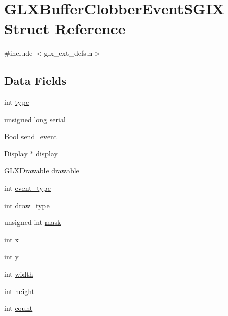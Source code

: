 \hypertarget{struct_g_l_x_buffer_clobber_event_s_g_i_x}{}\section{G\+L\+X\+Buffer\+Clobber\+Event\+S\+G\+IX Struct Reference}
\label{struct_g_l_x_buffer_clobber_event_s_g_i_x}


{\ttfamily \#include $<$glx\+\_\+ext\+\_\+defs.\+h$>$}

\subsection*{Data Fields}
\begin{DoxyCompactItemize}
\item 
int \hyperlink{struct_g_l_x_buffer_clobber_event_s_g_i_x_a36e3e8a5feea664623ea43d0f273b63a}{type}
\item 
unsigned long \hyperlink{struct_g_l_x_buffer_clobber_event_s_g_i_x_ac295e3276a7986eeae4d6a2a28c7e0b7}{serial}
\item 
Bool \hyperlink{struct_g_l_x_buffer_clobber_event_s_g_i_x_af43bf0edbe40a74ef58dfb546a75118b}{send\+\_\+event}
\item 
Display $\ast$ \hyperlink{struct_g_l_x_buffer_clobber_event_s_g_i_x_afef060d81026da75c846727f4a3de9d4}{display}
\item 
G\+L\+X\+Drawable \hyperlink{struct_g_l_x_buffer_clobber_event_s_g_i_x_a9c45674193ed80a79261c3b7518ee04f}{drawable}
\item 
int \hyperlink{struct_g_l_x_buffer_clobber_event_s_g_i_x_a0b405123f1d6528f1f4dfa7ff92bde9b}{event\+\_\+type}
\item 
int \hyperlink{struct_g_l_x_buffer_clobber_event_s_g_i_x_a25c31e8cbec0919f74a1e93ae74175b1}{draw\+\_\+type}
\item 
unsigned int \hyperlink{struct_g_l_x_buffer_clobber_event_s_g_i_x_a74b4ad1ad3cac011001151411f621da1}{mask}
\item 
int \hyperlink{struct_g_l_x_buffer_clobber_event_s_g_i_x_a5118d48c3c8d5253d39922b5014b52ff}{x}
\item 
int \hyperlink{struct_g_l_x_buffer_clobber_event_s_g_i_x_aef21efa11558a5b67861f96471c56003}{y}
\item 
int \hyperlink{struct_g_l_x_buffer_clobber_event_s_g_i_x_adad23535733161528427584a42bfc6eb}{width}
\item 
int \hyperlink{struct_g_l_x_buffer_clobber_event_s_g_i_x_a7838dbabb76c22aa8241310a3f2363ea}{height}
\item 
int \hyperlink{struct_g_l_x_buffer_clobber_event_s_g_i_x_ad8f4f0aae058e0a1ff542679823e37a9}{count}
\end{DoxyCompactItemize}


